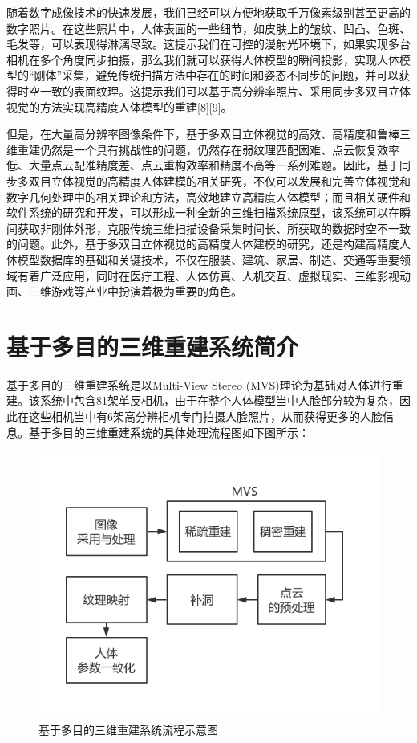\documentclass[10pt]{article}
\begin{document}
\par 随着数字成像技术的快速发展，我们已经可以方便地获取千万像素级别甚至更高的数字照片。在这些照片中，人体表面的一些细节，如皮肤上的皱纹、凹凸、色斑、毛发等，可以表现得淋漓尽致。这提示我们在可控的漫射光环境下，如果实现多台相机在多个角度同步拍摄，那么我们就可以获得人体模型的瞬间投影，实现人体模型的“刚体”采集，避免传统扫描方法中存在的时间和姿态不同步的问题，并可以获得时空一致的表面纹理。这提示我们可以基于高分辨率照片、采用同步多双目立体视觉的方法实现高精度人体模型的重建[8][9]。
\par 但是，在大量高分辨率图像条件下，基于多双目立体视觉的高效、高精度和鲁棒三维重建仍然是一个具有挑战性的问题，仍然存在弱纹理匹配困难、点云恢复效率低、大量点云配准精度差、点云重构效率和精度不高等一系列难题。因此，基于同步多双目立体视觉的高精度人体建模的相关研究，不仅可以发展和完善立体视觉和数字几何处理中的相关理论和方法，高效地建立高精度人体模型；而且相关硬件和软件系统的研究和开发，可以形成一种全新的三维扫描系统原型，该系统可以在瞬间获取非刚体外形，克服传统三维扫描设备采集时间长、所获取的数据时空不一致的问题。此外，基于多双目立体视觉的高精度人体建模的研究，还是构建高精度人体模型数据库的基础和关键技术，不仅在服装、建筑、家居、制造、交通等重要领域有着广泛应用，同时在医疗工程、人体仿真、人机交互、虚拟现实、三维影视动画、三维游戏等产业中扮演着极为重要的角色。

\section{基于多目的三维重建系统简介}
基于多目的三维重建系统是以Multi-View Stereo (MVS)理论为基础对人体进行重建。该系统中包含81架单反相机，由于在整个人体模型当中人脸部分较为复杂，因此在这些相机当中有6架高分辨相机专门拍摄人脸照片，从而获得更多的人脸信息。基于多目的三维重建系统的具体处理流程图如下图所示：
\begin{figure}[H]
\begin{center}
\includegraphics[scale=0.5]{schematic.png}
\caption{基于多目的三维重建系统流程示意图}
\end{center}
\end{figure}
\end{document}
